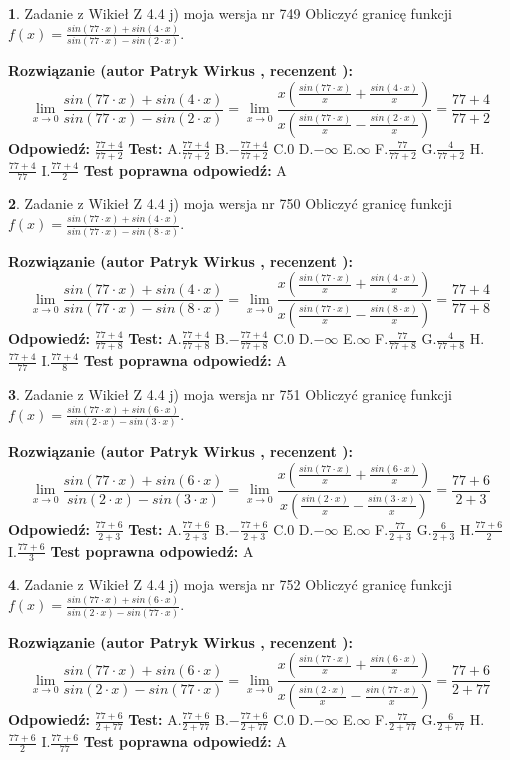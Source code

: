 \documentclass[12pt, a4paper]{article}
\theoremstyle{definition} %
\newtheorem{zad}{}
\newcommand{\zadStart}[1]{\begin{zad}#1\newline}
\newcommand{\zadStop}{\end{zad}}
\newcommand{\rozwStart}[2]{\noindent \textbf{Rozwiązanie (autor #1 , recenzent #2): }\newline}
\newcommand{\rozwStop}{\newline}
\newcommand{\odpStart}{\noindent \textbf{Odpowiedź:}\newline}
\newcommand{\odpStop}{\newline}
\newcommand{\testStart}{\noindent \textbf{Test:}\newline}
\newcommand{\testStop}{\newline}
\newcommand{\kluczStart}{\noindent \textbf{Test poprawna odpowiedź:}\newline}
\newcommand{\kluczStop}{\newline}
\begin{document}
\zadStart{Zadanie z Wikieł Z 4.4 j) moja wersja nr 749}
Obliczyć granicę funkcji $f(x)=\frac{sin(77\cdot x) +sin(4\cdot x)}{sin(77\cdot x) -sin(2\cdot x)}$.
\zadStop
\rozwStart{Patryk Wirkus}{}
$$\lim\limits_{x\to 0}\frac{sin(77\cdot x) +sin(4\cdot x)}{sin(77\cdot x) -sin(2\cdot x)}=\lim\limits_{x\to 0}\frac{x(\frac{sin(77\cdot x)}{x}+\frac{sin(4\cdot x)}{x})}{x(\frac{sin(77\cdot x)}{x}-\frac{sin(2\cdot x)}{x})}=\frac{77+4}{77+2}$$
\rozwStop
\odpStart
$\frac{77+4}{77+2}$
\odpStop
\testStart
A.$\frac{77+4}{77+2}$
B.$-\frac{77+4}{77+2}$
C.$0$
D.$-\infty$
E.$\infty$
F.$\frac{77}{77+2}$
G.$\frac{4}{77+2}$
H.$\frac{77+4}{77}$
I.$\frac{77+4}{2}$
\testStop
\kluczStart
A
\kluczStop



\zadStart{Zadanie z Wikieł Z 4.4 j) moja wersja nr 750}
Obliczyć granicę funkcji $f(x)=\frac{sin(77\cdot x) +sin(4\cdot x)}{sin(77\cdot x) -sin(8\cdot x)}$.
\zadStop
\rozwStart{Patryk Wirkus}{}
$$\lim\limits_{x\to 0}\frac{sin(77\cdot x) +sin(4\cdot x)}{sin(77\cdot x) -sin(8\cdot x)}=\lim\limits_{x\to 0}\frac{x(\frac{sin(77\cdot x)}{x}+\frac{sin(4\cdot x)}{x})}{x(\frac{sin(77\cdot x)}{x}-\frac{sin(8\cdot x)}{x})}=\frac{77+4}{77+8}$$
\rozwStop
\odpStart
$\frac{77+4}{77+8}$
\odpStop
\testStart
A.$\frac{77+4}{77+8}$
B.$-\frac{77+4}{77+8}$
C.$0$
D.$-\infty$
E.$\infty$
F.$\frac{77}{77+8}$
G.$\frac{4}{77+8}$
H.$\frac{77+4}{77}$
I.$\frac{77+4}{8}$
\testStop
\kluczStart
A
\kluczStop



\zadStart{Zadanie z Wikieł Z 4.4 j) moja wersja nr 751}
Obliczyć granicę funkcji $f(x)=\frac{sin(77\cdot x) +sin(6\cdot x)}{sin(2\cdot x) -sin(3\cdot x)}$.
\zadStop
\rozwStart{Patryk Wirkus}{}
$$\lim\limits_{x\to 0}\frac{sin(77\cdot x) +sin(6\cdot x)}{sin(2\cdot x) -sin(3\cdot x)}=\lim\limits_{x\to 0}\frac{x(\frac{sin(77\cdot x)}{x}+\frac{sin(6\cdot x)}{x})}{x(\frac{sin(2\cdot x)}{x}-\frac{sin(3\cdot x)}{x})}=\frac{77+6}{2+3}$$
\rozwStop
\odpStart
$\frac{77+6}{2+3}$
\odpStop
\testStart
A.$\frac{77+6}{2+3}$
B.$-\frac{77+6}{2+3}$
C.$0$
D.$-\infty$
E.$\infty$
F.$\frac{77}{2+3}$
G.$\frac{6}{2+3}$
H.$\frac{77+6}{2}$
I.$\frac{77+6}{3}$
\testStop
\kluczStart
A
\kluczStop



\zadStart{Zadanie z Wikieł Z 4.4 j) moja wersja nr 752}
Obliczyć granicę funkcji $f(x)=\frac{sin(77\cdot x) +sin(6\cdot x)}{sin(2\cdot x) -sin(77\cdot x)}$.
\zadStop
\rozwStart{Patryk Wirkus}{}
$$\lim\limits_{x\to 0}\frac{sin(77\cdot x) +sin(6\cdot x)}{sin(2\cdot x) -sin(77\cdot x)}=\lim\limits_{x\to 0}\frac{x(\frac{sin(77\cdot x)}{x}+\frac{sin(6\cdot x)}{x})}{x(\frac{sin(2\cdot x)}{x}-\frac{sin(77\cdot x)}{x})}=\frac{77+6}{2+77}$$
\rozwStop
\odpStart
$\frac{77+6}{2+77}$
\odpStop
\testStart
A.$\frac{77+6}{2+77}$
B.$-\frac{77+6}{2+77}$
C.$0$
D.$-\infty$
E.$\infty$
F.$\frac{77}{2+77}$
G.$\frac{6}{2+77}$
H.$\frac{77+6}{2}$
I.$\frac{77+6}{77}$
\testStop
\kluczStart
A
\kluczStop
\end{document}
